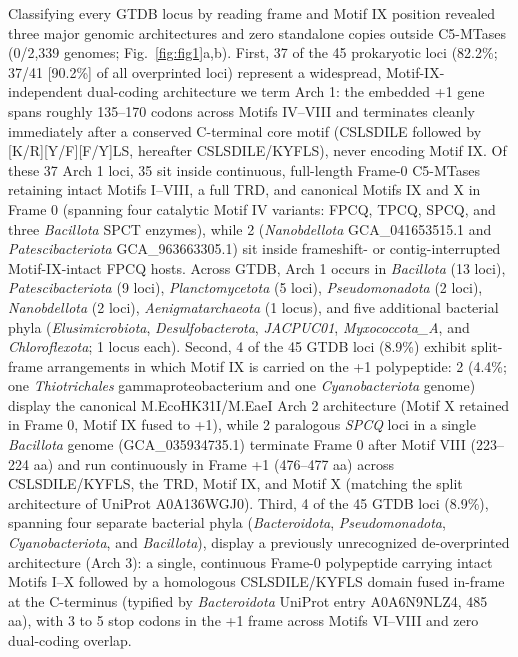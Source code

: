 \documentclass[10pt,letterpaper]{article}
\newcommand{\spname}[1]{\textit{#1}}
\begin{document}
Classifying every GTDB locus by reading frame and Motif IX position revealed three major genomic architectures and zero standalone copies outside C5-MTases (0/2,339 genomes; Fig.~\ref{fig:fig1}a,b). First, 37 of the 45 prokaryotic loci (82.2\%; 37/41 [90.2\%] of all overprinted loci) represent a widespread, Motif-IX-independent dual-coding architecture we term Arch 1: the embedded +1 gene spans roughly 135--170 codons across Motifs IV--VIII and terminates cleanly immediately after a conserved C-terminal core motif (CSLSDILE followed by [K/R][Y/F][F/Y]LS, hereafter CSLSDILE/KYFLS), never encoding Motif IX. Of these 37 Arch 1 loci, 35 sit inside continuous, full-length Frame-0 C5-MTases retaining intact Motifs I--VIII, a full TRD, and canonical Motifs IX and X in Frame 0 (spanning four catalytic Motif IV variants: FPCQ, TPCQ, SPCQ, and three \spname{Bacillota} SPCT enzymes), while 2 (\spname{Nanobdellota} GCA\_041653515.1 and \spname{Patescibacteriota} GCA\_963663305.1) sit inside frameshift- or contig-interrupted Motif-IX-intact FPCQ hosts. Across GTDB, Arch 1 occurs in \spname{Bacillota} (13 loci), \spname{Patescibacteriota} (9 loci), \spname{Planctomycetota} (5 loci), \spname{Pseudomonadota} (2 loci), \spname{Nanobdellota} (2 loci), \spname{Aenigmatarchaeota} (1 locus), and five additional bacterial phyla (\spname{Elusimicrobiota}, \spname{Desulfobacterota}, \spname{JACPUC01}, \spname{Myxococcota\_A}, and \spname{Chloroflexota}; 1 locus each). Second, 4 of the 45 GTDB loci (8.9\%) exhibit split-frame arrangements in which Motif IX is carried on the +1 polypeptide: 2 (4.4\%; one \spname{Thiotrichales} gammaproteobacterium and one \spname{Cyanobacteriota} genome) display the canonical M.EcoHK31I/M.EaeI Arch 2 architecture (Motif X retained in Frame 0, Motif IX fused to +1), while 2 paralogous \spname{SPCQ} loci in a single \spname{Bacillota} genome (GCA\_035934735.1) terminate Frame 0 after Motif VIII (223--224 aa) and run continuously in Frame +1 (476--477 aa) across CSLSDILE/KYFLS, the TRD, Motif IX, and Motif X (matching the split architecture of UniProt A0A136WGJ0). Third, 4 of the 45 GTDB loci (8.9\%), spanning four separate bacterial phyla (\spname{Bacteroidota}, \spname{Pseudomonadota}, \spname{Cyanobacteriota}, and \spname{Bacillota}), display a previously unrecognized de-overprinted architecture (Arch 3): a single, continuous Frame-0 polypeptide carrying intact Motifs I--X followed by a homologous CSLSDILE/KYFLS domain fused in-frame at the C-terminus (typified by \spname{Bacteroidota} UniProt entry A0A6N9NLZ4, 485 aa), with 3 to 5 stop codons in the +1 frame across Motifs VI--VIII and zero dual-coding overlap.
\end{document}
